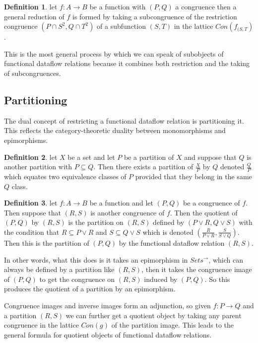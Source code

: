 \documentclass[a4paper,11pt, notitlepage]{report}
\theoremstyle{definition}
\newtheorem{definition}{Definition}[section]
\begin{document}
\begin{definition}
let $f: A \to B$ be a function with $(P,Q)$ a congruence then a general reduction of $f$ is formed by taking a subcongruence of the restriction congruence $(P \cap S^2, Q \cap T^2)$ of a subfunction $(S,T)$ in the lattice $Con(f_{(S,T})$.
\end{definition}

This is the most general process by which we can speak of subobjects of functional dataflow relations because it combines both restriction and the taking of subcongruences.

\subsection{Partitioning}
The dual concept of restricting a functional dataflow relation is partitioning it. This reflects the category-theoretic duality between monomorphisms and epimorphisms.

\begin{definition}
let $X$ be a set and let $P$ be a partition of $X$ and suppose that $Q$ is another partition with $P \subseteq Q$. Then there exists a partition of $\frac{X}{P}$ by $Q$ denoted $\frac{Q}{P}$ which equates two equivalence classes of $P$ provided that they belong in the same $Q$ class.
\end{definition}

\begin{definition}
let $f: A \to B$ be a function and let $(P,Q)$ be a congruence of $f$. Then suppose that $(R,S)$ is another congruence of $f$. Then the quotient of $(P,Q)$ by $(R,S)$ is the partition on $(R,S)$ defined by $(P \vee R, Q \vee S)$ with the condition that $R \subseteq P \vee R$ and $S \subseteq Q \vee S$ which is denoted $(\frac{R}{P \vee R}, \frac{S}{S \vee Q})$. Then this is the partition of $(P,Q)$ by the functional dataflow relation $(R,S)$.
\end{definition}

In other words, what this does is it takes an epimorphism in $Sets^{\to}$, which can always be defined by a partition like $(R,S)$, then it takes the congruence image of $(P,Q)$ to get the congruence on $(R,S)$ induced by $(P,Q)$. So this produces the quotient of a partition by an epimorphism.

Congruence images and inverse images form an adjunction, so given $f: P \to Q$ and a partition $(R,S)$ we can further get a quotient object by taking any parent congruence in the lattice $Con(g)$ of the partition image. This leads to the general formula for quotient objects of functional dataflow relations.
\end{document}
